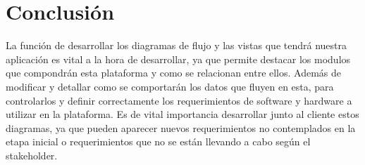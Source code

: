\documentclass[letterpaper,openright,10pt,oneside]{report}
\begin{document}
\chapter{Conclusión}
La función de desarrollar los diagramas de flujo y las vistas que tendrá nuestra aplicación es vital a la hora de desarrollar, ya que permite destacar los modulos que compondrán esta plataforma y como se relacionan entre ellos. Además de modificar y detallar como se comportarán los datos que fluyen en esta, para controlarlos y definir correctamente los requerimientos de software y hardware a utilizar en la plataforma.
Es de vital importancia desarrollar junto al cliente estos diagramas, ya que pueden aparecer nuevos requerimientos no contemplados en la etapa inicial o requerimientos que no se están llevando a cabo según el stakeholder.
\end{document}
